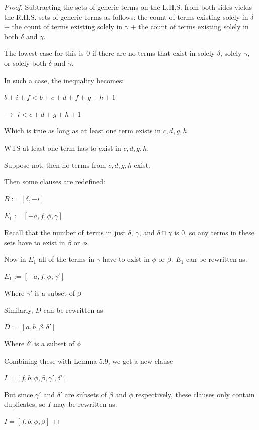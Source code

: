 \documentclass[manuscript]{acmart}
\begin{document}
\begin{proof}
        Subtracting the sets of generic terms on the L.H.S. from both sides
        yields the R.H.S. sets of generic terms as follows: the count
        of terms existing solely in $\delta$ + the count of terms existing
        solely in $\gamma$ + the count of terms existing solely in both $\delta$
        and $\gamma$.

        The lowest case for this is 0 if there are no terms that exist in 
        solely $\delta$, solely $\gamma$, or solely both $\delta$ and $\gamma$.

        In such a case, the inequality becomes:

        $b + i + f < b + c + d + f + g + h + 1$

        $\rightarrow$ $i < c + d + g + h + 1$

        Which is true as long as at least one term exists in {$c, d, g, h$}

        WTS at least one term has to exist in {$c, d, g, h$}.

        Suppose not, then no terms from {$c, d, g, h$} exist.

        Then some clauses are redefined:

        $B := [\delta, -i]$

        $E_1 := [-a, f, \phi, \gamma]$
        
        Recall that the number of terms in just $\delta$, $\gamma$, and 
        $\delta \cap \gamma$ is 0, so any terms in these sets have
        to exist in $\beta$ or $\phi$.

        Now in $E_1$ all of the terms in $\gamma$ have to exist in $\phi$
        or $\beta$. $E_1$ can be rewritten as:

        $E_1 := [-a, f, \phi, \gamma']$

        Where $\gamma'$ is a subset of $\beta$

        Similarly, $D$ can be rewritten as 

        $D := [a, b, \beta, \delta']$

        Where $\delta'$ is a subset of $\phi$

        Combining these with Lemma 5.9, we get a new clause

        $I = [f, b, \phi, \beta, \gamma', \delta']$

        But since $\gamma'$ and $\delta'$ are subsets of $\beta$ and
        $\phi$ respectively, these clauses only contain duplicates, so
        $I$ may be rewritten as:

        $I = [f, b, \phi, \beta]$


\end{proof}
\end{document}
